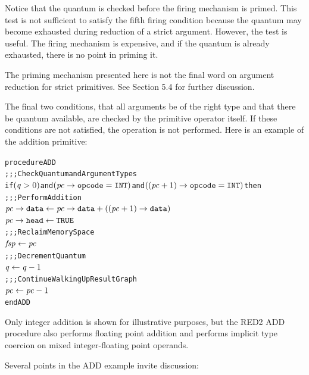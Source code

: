 Notice that the quantum is checked before the firing mechanism is primed. This test is
not sufficient to satisfy the fifth firing condition because the quantum may become
exhausted during reduction of a strict argument. However, the test is useful. The firing
mechanism is expensive, and if the quantum is already exhausted, there is no point in
priming it.

The priming mechanism presented here is not the final word on argument reduction for
strict primitives. See Section 5.4 for further discussion.

The final two conditions, that all arguments be of the right type and that there be
quantum available, are checked by the primitive operator itself. If these conditions are
not satisfied, the operation is not performed. Here is an example of the addition
primitive:

\par\smallskip\noindent\begin{minipage}{\linewidth}
\begin{alltt}
procedure ADD
  \textrm{;;; Check Quantum and Argument Types}
  if \((\rt{q}>0)\) and \((\rtfield{pc}{opcode} = \mathtt{INT})\) and \(((\rt{pc}+1)\rightarrow\mathtt{opcode} = \mathtt{INT})\) then
    \textrm{;;; Perform Addition}
    \(\rtfield{pc}{data} \leftarrow \rtfield{pc}{data} + ((\rt{pc}+1)\rightarrow\mathtt{data})\)
    \(\rtfield{pc}{head} \leftarrow \mathtt{TRUE}\)
    \textrm{;;; Reclaim Memory Space}
    \(\rt{fsp} \leftarrow \rt{pc}\)
    \textrm{;;; Decrement Quantum}
    \(\rt{q} \leftarrow \rt{q}-1\)
  \textrm{;;; Continue Walking Up Result Graph}
\(\rt{pc} \leftarrow \rt{pc}-1\)
end ADD
\end{alltt}
\end{minipage}\par\smallskip



Only integer addition is shown for illustrative purposes, but the RED2 ADD procedure also
performs floating point addition and performs implicit type coercion on mixed
integer-floating point operands.

Several points in the ADD example invite discussion:

